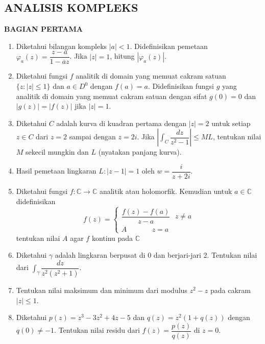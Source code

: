 \documentclass[12pt,twoside]{article}
\begin{document}
\subsection{ANALISIS KOMPLEKS}
\textbf{BAGIAN PERTAMA}
\begin{enumerate}
	\item Diketahui bilangan kompleks $|a|<1$. Didefinisikan pemetaan $\varphi_a(z)=\dfrac{z-a}{1-\overline{a}z}$. Jika $|z|=1$, hitung $|\varphi_a(z)|$.

	\item Diketahui fungsi $f$ analitik di domain yang memuat cakram satuan $\{z:|z|\leq 1\}$ dan $a\in D^0$ dengan $f(a)=a$. Didefinisikan fungsi $g$ yang analitik di domain yang memuat cakram satuan dengan sifat $g(0)=0$ dan $|g(z)|=|f(z)|$ jika $|z|=1$.
	\item Diketahui $C$ adalah kurva di kuadran pertama dengan $|z|=2$ untuk setiap $z\in C$ dari $z=2$ sampai dengan $z=2i$. Jika $\left|\displaystyle\int_{C}\dfrac{dz}{z^2-1}\right|\leq ML$, tentukan nilai $M$ sekecil mungkin dan $L$ (nyatakan panjang kurva).

	\item Hasil pemetaan lingkaran $L:|z-1|=1$ oleh $w=\dfrac{i}{z+2i}$.

	\item Diketahui fungsi $f:\mathbb{C}\to\mathbb{C}$ analitik atau holomorfik. Kemudian untuk $a\in \mathbb{C}$ didefinisikan \\
	      $$f(z)=\begin{cases}
			      \dfrac{f(z)-f(a)}{z-a}~~~z\neq a \\A~~~~~~~~~~~~~~~~z=a
		      \end{cases}$$
	      tentukan nilai $A$ agar $f$ kontinu pada $\mathbb{C}$

	\item Diketahui $\gamma$ adalah lingkaran berpusat di 0 dan berjari-jari 2. Tentukan nilai dari $\displaystyle\int_{\gamma}\dfrac{dz}{z^2(z^2+1)}$.

	\item Tentukan nilai maksimum dan minimum dari modulus $z^2-z$ pada cakram $|z|\leq 1$.

	\item Diketahui $p(z)=z^3-3z^2+4z-5$ dan $q(z)=z^2(1+q(z))$ dengan $q(0)\neq -1$. Tentukan nilai residu dari $f(z)=\dfrac{p(z)}{q(z)}$ di $z=0$.
\end{enumerate}
\end{document}
